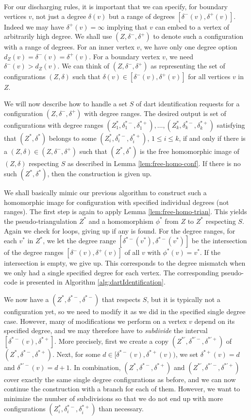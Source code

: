 \documentclass[10pt,a4paper]{article}
\begin{document}
For our discharging rules, it is important that we can specify, for boundary vertices $v$, not just a degree $\delta(v)$ but a range of degrees $[\delta^-(v),\delta^+(v)]$. Indeed
we may have $\delta^+(v)=\infty$ implying that $v$ can embed to a vertex of arbitrarily high degree.
We shall use  $(Z,\delta^-,\delta^+)$ to denote such a configuration with a range of degrees. For an inner vertex $v$, we have only one degree option $d_Z(v)=\delta^-(v)=\delta^+(v)$. For a boundary vertex $v$, we need
$\delta^-(v)>d_Z(v)$. We can think of $(Z,\delta^-,\delta^+)$ as representing the set of configurations $(Z,\delta)$
such that $\delta(v)\in[\delta^-(v),\delta^+(v)]$ for all vertices $v$ in $Z$.


We will now describe how to handle a set $S$ of dart identification requests for a configuration $(Z,\delta^-,\delta^+)$ with degree ranges.
The desired output is set of 
configurations with degree
ranges $(Z_1^*,\delta^{*-}_1,\delta^{*+}_1),\ldots,(Z_k^*,\delta^{*-}_k,\delta^{*+}_k)$ satisfying that
$(Z^*,\delta^*)$ belongs
to some $(Z_i^*,\delta^{*-}_i,\delta^{*+}_i)$, 
$1\leq i\leq k$, if and only if
there is a $(Z,\delta)\in (Z,\delta^-,\delta^+)$ such that $(Z^*,\delta^*)$ is the free homomorphic image of $(Z,\delta)$ respecting $S$ as described in Lemma \ref{lem:free-homo-conf}. If there is no such $(Z^*,\delta^*)$, then the construction is given up.

We shall basically mimic our previous algorithm to construct such a homomorphic
image for configuration with specified individual degrees (not ranges).
The first step is again to apply Lemma \ref{lem:free-homo-trian}.
This yields the pseudo-triangulation $Z^*$ and a homomorphism $\phi^*$ from $Z$ to $Z^*$ respecting $S$.
Again we check for loops, giving up if any is found.
For the degree ranges, for each $v^*$ in $Z^*$, we let the degree range $[\delta^{*-}(v^*),\delta^{*-}(v^*)]$ be the intersection of the degree ranges $[\delta^{-}(v),\delta^{+}(v)]$ of
all $v$ with $\phi^*(v) = v^*$. If the intersection is empty, we give up. This corresponds to the degree mismatch when we only had a single specified degree for each vertex.
The corresponding pseudo-code is presented in Algorithm \ref{alg:dartIdentification}.

We now have a $(Z^*,\delta^{*-},
\delta^{*-})$ that respects $S$, but it is typically not a configuration yet, so we need to modify it as we did in the specified single degree case. However, many of modifications we perform on  
a vertex $v$ depend on its specified degree, and we may therefore have to \emph{subdivide} the interval $[\delta^{*-}(v), 
\delta^{*+}]$.
More precisely, first
we create a copy $(Z^{*\prime},\delta^{*\prime-}, 
\delta^{*\prime+})$
of $(Z^*,\delta^{*-}, 
\delta^{*+})$.
Next, for some $d\in [\delta^{*-}(v),\delta^{*+}(v))$,  we
set $\delta^{*+}(v)=d$ and $\delta^{*\prime-}(v)=d+1$.
In combination, 
$(Z^*,\delta^{*-},\delta^{*+})$ and $(Z^{*\prime},\delta^{*\prime-}, 
\delta^{*\prime+})$ cover exactly the  same single degree configurations as before, and we can now continue the construction with a branch for each of them. However, we want to minimize the number of subdivisions so that we do not end up with more configurations  $(Z_i^*,\delta^{*-}_i,\delta^{*+}_i)$ than necessary.
\end{document}
